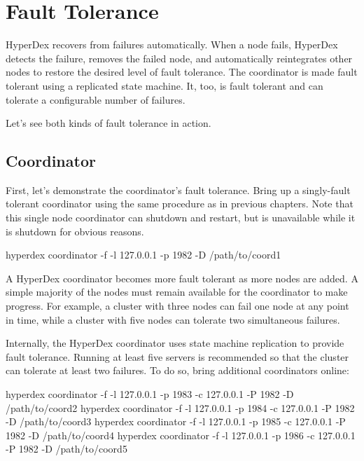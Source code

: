 \chapter{Fault Tolerance}

HyperDex recovers from failures automatically.  When a node fails, HyperDex
detects the failure, removes the failed node, and automatically reintegrates
other nodes to restore the desired level of fault tolerance.  The coordinator is
made fault tolerant using a replicated state machine.  It, too, is fault
tolerant and can tolerate a configurable number of failures.

Let's see both kinds of fault tolerance in action.

\section{Coordinator}

First, let's demonstrate the coordinator's fault tolerance.  Bring up a
singly-fault tolerant coordinator using the same procedure as in previous
chapters.  Note that this single node coordinator can shutdown and restart, but
is unavailable while it is shutdown for obvious reasons.

\begin{consolecode}
hyperdex coordinator -f -l 127.0.0.1 -p 1982 -D /path/to/coord1
\end{consolecode}

A HyperDex coordinator becomes more fault tolerant as more nodes are added.  A
simple majority of the nodes must remain available for the coordinator to make
progress.  For example, a cluster with three nodes can fail one node at any
point in time, while a cluster with five nodes can tolerate two simultaneous
failures.

Internally, the HyperDex coordinator uses state machine replication to provide
fault tolerance.  Running at least five servers is recommended so that the
cluster can tolerate at least two failures.  To do so, bring additional
coordinators online:

\begin{consolecode}
hyperdex coordinator -f -l 127.0.0.1 -p 1983 -c 127.0.0.1 -P 1982 -D /path/to/coord2
hyperdex coordinator -f -l 127.0.0.1 -p 1984 -c 127.0.0.1 -P 1982 -D /path/to/coord3
hyperdex coordinator -f -l 127.0.0.1 -p 1985 -c 127.0.0.1 -P 1982 -D /path/to/coord4
hyperdex coordinator -f -l 127.0.0.1 -p 1986 -c 127.0.0.1 -P 1982 -D /path/to/coord5
\end{consolecode}

